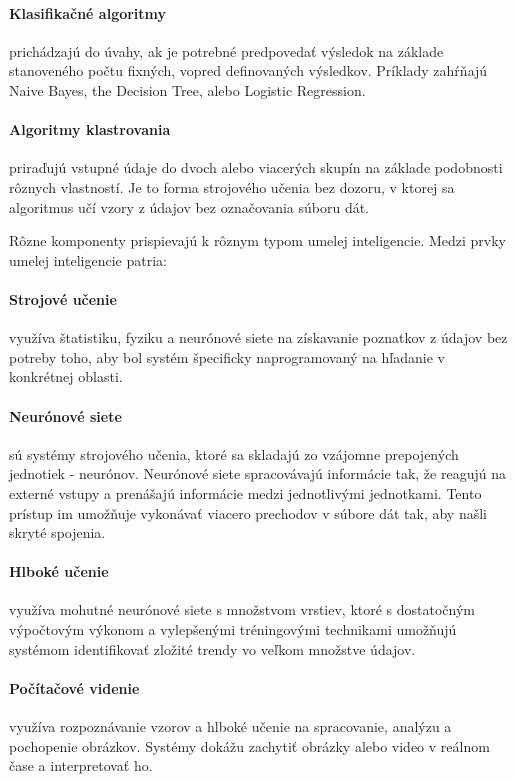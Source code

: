 \paragraph{Klasifikačné algoritmy} prichádzajú do úvahy, ak je potrebné predpovedať výsledok na základe stanoveného počtu fixných, vopred definovaných výsledkov. Príklady zahŕňajú Naive Bayes, the Decision Tree, alebo Logistic Regression.

\paragraph{Algoritmy klastrovania} priraďujú vstupné údaje do dvoch alebo viacerých skupín na základe podobnosti rôznych vlastností. Je to forma strojového učenia bez dozoru, v ktorej sa algoritmus učí vzory z údajov bez označovania súboru dát.

Rôzne komponenty prispievajú k rôznym typom umelej inteligencie. Medzi prvky umelej inteligencie patria:
\paragraph{Strojové učenie} využíva štatistiku, fyziku a neurónové siete na získavanie poznatkov z údajov bez potreby toho, aby bol systém špecificky naprogramovaný na hľadanie v konkrétnej oblasti.

\paragraph{Neurónové siete} sú systémy strojového učenia, ktoré sa skladajú zo vzájomne prepojených jednotiek - neurónov. Neurónové siete spracovávajú informácie tak, že reagujú na externé vstupy a prenášajú informácie medzi jednotlivými jednotkami. Tento prístup im umožňuje vykonávať viacero prechodov v súbore dát tak, aby našli skryté spojenia.

\paragraph{Hlboké učenie} využíva mohutné neurónové siete s množstvom vrstiev, ktoré s dostatočným výpočtovým výkonom a vylepšenými tréningovými technikami umožňujú systémom identifikovať zložité trendy vo veľkom množstve údajov.

\paragraph{Počítačové videnie} využíva rozpoznávanie vzorov a hlboké učenie na spracovanie, analýzu a pochopenie obrázkov. Systémy dokážu zachytiť obrázky alebo video v reálnom čase a interpretovať ho.

